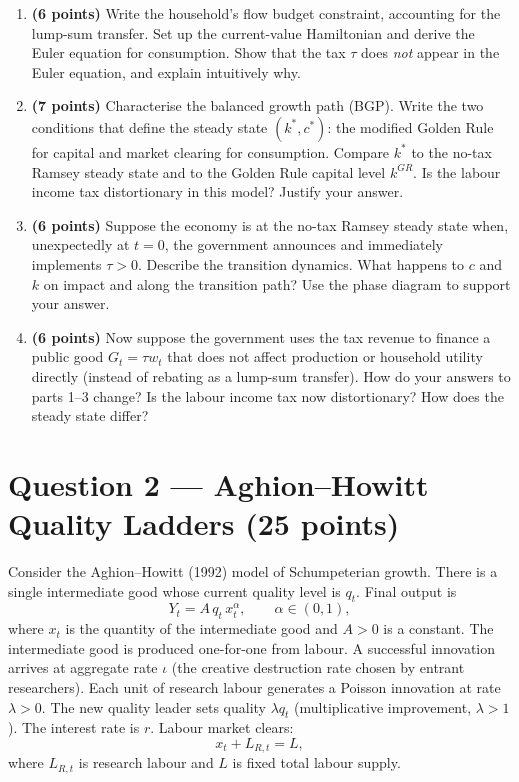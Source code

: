 \documentclass[a4paper,11pt]{article}
\begin{document}
\begin{enumerate}[label=\textbf{\arabic*.}, leftmargin=*, itemsep=10pt]

    \item \textbf{(6 points)} Write the household's flow budget constraint, accounting for
    the lump-sum transfer. Set up the current-value Hamiltonian and derive the Euler
    equation for consumption. Show that the tax $\tau$ does \emph{not} appear in the Euler
    equation, and explain intuitively why.

    \item \textbf{(7 points)} Characterise the balanced growth path (BGP). Write the two
    conditions that define the steady state $(k^*, c^*)$: the modified Golden Rule for
    capital and market clearing for consumption. Compare $k^*$ to the no-tax Ramsey steady
    state and to the Golden Rule capital level $k^{GR}$. Is the labour income tax
    distortionary in this model? Justify your answer.

    \item \textbf{(6 points)} Suppose the economy is at the no-tax Ramsey steady state when,
    unexpectedly at $t=0$, the government announces and immediately implements $\tau > 0$.
    Describe the transition dynamics. What happens to $c$ and $k$ on impact and along the
    transition path? Use the phase diagram to support your answer.

    \item \textbf{(6 points)} Now suppose the government uses the tax revenue to finance a
    public good $G_t = \tau w_t$ that does not affect production or household utility
    directly (instead of rebating as a lump-sum transfer). How do your answers to parts
    1--3 change? Is the labour income tax now distortionary? How does the steady state
    differ?

\end{enumerate}

\clearpage

\section{Question 2 --- Aghion--Howitt Quality Ladders \hfill (25 points)}

Consider the Aghion--Howitt (1992) model of Schumpeterian growth. There is a single
intermediate good whose current quality level is $q_t$. Final output is
\[
    Y_t = A\,q_t\,x_t^{\alpha}, \qquad \alpha \in (0,1),
\]
where $x_t$ is the quantity of the intermediate good and $A > 0$ is a constant.
The intermediate good is produced one-for-one from labour. A successful innovation arrives
at aggregate rate $\iota$ (the creative destruction rate chosen by entrant researchers).
Each unit of research labour generates a Poisson innovation at rate $\lambda > 0$.
The new quality leader sets quality $\lambda q_t$ (multiplicative improvement,
$\lambda > 1$). The interest rate is $r$. Labour market clears:
\[
    x_t + L_{R,t} = L,
\]
where $L_{R,t}$ is research labour and $L$ is fixed total labour supply.
\end{document}
